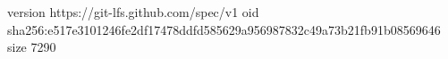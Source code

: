 version https://git-lfs.github.com/spec/v1
oid sha256:e517e3101246fe2df17478ddfd585629a956987832c49a73b21fb91b08569646
size 7290
